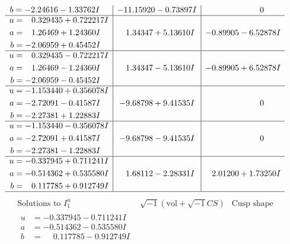 \documentclass[1p]{elsarticle_modified}
\theoremstyle{definition}
\newcommand{\I}{\sqrt{-1}}
\begin{document}
$$\begin{array}{c|c|c}
\begin{aligned}
b &= -2.24616 - 1.33762 I\end{aligned}
 & -11.15920 - 0.73897 I & \phantom{-0.000000 } 0 \\ \hline\begin{aligned}
u &= \phantom{-}0.329435 + 0.722217 I \\
a &= \phantom{-}1.26469 + 1.24360 I \\
b &= -2.06959 + 0.45452 I\end{aligned}
 & \phantom{-}1.34347 + 5.13610 I & -0.89905 - 6.52878 I \\ \hline\begin{aligned}
u &= \phantom{-}0.329435 - 0.722217 I \\
a &= \phantom{-}1.26469 - 1.24360 I \\
b &= -2.06959 - 0.45452 I\end{aligned}
 & \phantom{-}1.34347 - 5.13610 I & -0.89905 + 6.52878 I \\ \hline\begin{aligned}
u &= -1.153440 + 0.356078 I \\
a &= -2.72091 - 0.41587 I \\
b &= -2.27381 + 1.22883 I\end{aligned}
 & -9.68798 + 9.41535 I & \phantom{-0.000000 } 0 \\ \hline\begin{aligned}
u &= -1.153440 - 0.356078 I \\
a &= -2.72091 + 0.41587 I \\
b &= -2.27381 - 1.22883 I\end{aligned}
 & -9.68798 - 9.41535 I & \phantom{-0.000000 } 0 \\ \hline\begin{aligned}
u &= -0.337945 + 0.711241 I \\
a &= -0.514362 + 0.535580 I \\
b &= \phantom{-}0.117785 + 0.912749 I\end{aligned}
 & \phantom{-}1.68112 - 2.28331 I & \phantom{-}2.01200 + 1.73250 I\\
 \hline 
 \end{array}$$\newpage$$\begin{array}{c|c|c}  
\text{Solutions to }I^u_{1}& \I (\text{vol} + \sqrt{-1}CS) & \text{Cusp shape}\\
 \hline 
\begin{aligned}
u &= -0.337945 - 0.711241 I \\
a &= -0.514362 - 0.535580 I \\
b &= \phantom{-}0.117785 - 0.912749 I\end{aligned}

\end{array}$$
\end{document}
